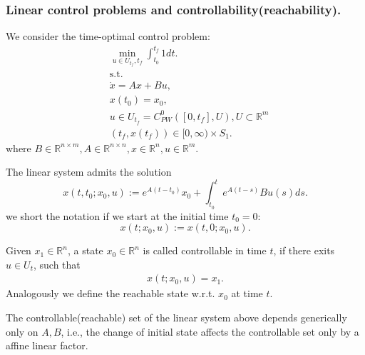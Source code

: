 \subsubsection{Linear control problems and controllability(reachability).}
We consider the time-optimal control problem:
\begin{equation}\tag{(P4.1)}\label{prob:P4.1}
\begin{aligned}
	&\min_{u \in U_{t_f}, t_f} \int_{t_0}^{t_f} 1 dt.   \\
	&\text{s.t.}\\
	& \dot{x} = Ax + Bu, \\
	& x(t_0) = x_0,\\
	& u \in U_{t_f} = C_{PW}^0([0, t_f], U), U \subset \mathbb{R}^m \\
	& (t_f, x(t_f)) \in [0, \infty) \times S_1. 	
\end{aligned}
\end{equation}
where $B \in \mathbb{R}^{n \times m}, A \in \mathbb{R}^{n \times  n}, x \in \mathbb{R}^n, u \in \mathbb{R}^m $. 

\begin{definition}
	The linear system admits the solution
	\begin{equation}
		x(t, t_0;x_0, u):= e^{A(t - t_0)} x_0 + \int_{t_0}^{t} e^{A(t - s)} Bu(s)ds. 
	\end{equation}
	we short the notation if we start at the initial time $t_0 = 0$:
	\begin{equation}
		x(t; x_0, u):= x(t, 0;x_0, u).
	\end{equation}
\end{definition}


\begin{definition}
Given $x_1 \in \mathbb{R}^n$, a state $x_0 \in \mathbb{R}^n$ is called controllable in time $t$, if there exits $u \in U_t$, such that
\begin{align*}
	x(t; x_0, u) = x_1. 
\end{align*}
Analogously we define the reachable state w.r.t. $x_0$ at time $t$. 
\end{definition}

The controllable(reachable) set of the linear system above depends generically only on $A, B$, i.e., the change of initial state affects the controllable set only by a affine linear factor. 

